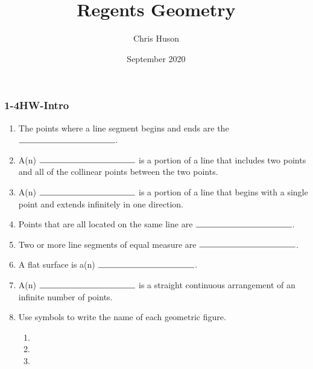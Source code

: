 \documentclass[12pt, twoside]{article}
\title{Regents Geometry}
\author{Chris Huson}
\date{September 2020}
\begin{document}
\subsubsection*{1-4HW-Intro}
\begin{enumerate}
\item The points where a line segment begins and ends are the $\rule{4cm}{0.15mm}$. \smallskip
\item A(n) $\rule{4cm}{0.15mm}$ is a portion of a line that includes two points and all of the collinear points between the two points.\smallskip
\item A(n) $\rule{4cm}{0.15mm}$ is a portion of a line that begins with a single point and extends infinitely in one direction.
\item Points that are all located on the same line are $\rule{4cm}{0.15mm}$.\bigskip
\item Two or more line segments of equal measure are $\rule{4cm}{0.15mm}$.\bigskip
\item A flat surface is a(n) $\rule{4cm}{0.15mm}$. \bigskip
\item A(n) $\rule{4cm}{0.15mm}$ is a straight continuous arrangement of an infinite number of points.

\item Use symbols to write the name of each geometric figure.
  \begin{enumerate}
  \item %
     \bigskip
  \item \hspace{1cm}%
     \bigskip
    \item %
  \end{enumerate}


\end{enumerate}
\end{document}

